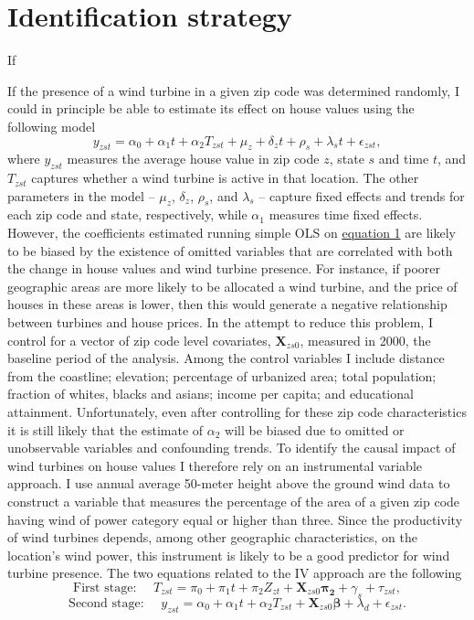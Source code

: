 \documentclass[twoside,12pt]{article}
\begin{document}
\section{Identification strategy}
If 

If the presence of a wind turbine in a given zip code was determined randomly, I could in principle be able to estimate its effect on house values using the following model
\begin{equation}\label{estimation}
y_{zst}=\alpha_0 + \alpha_1 t + \alpha_2 T_{zst} + \mu_z + \delta_z t + \rho_s + \lambda_s t + \epsilon_{zst},
\end{equation}
where $y_{zst}$ measures the average house value in zip code $z$, state $s$ and time $t$, and $T_{zst}$ captures whether a wind turbine is active in that location. The other parameters in the model -- $\mu_z$, $\delta_z$, $\rho_s$, and $\lambda_s$ -- capture fixed effects and trends for each zip code and state, respectively, while $\alpha_1$ measures time fixed effects. However, the coefficients estimated running simple OLS on \hyperref[estimation]{equation 1} are likely to be biased by the existence of omitted variables that are correlated with both the change in house values and wind turbine presence. For instance, if poorer geographic areas are more likely to be allocated a wind turbine, and the price of houses in these areas is lower, then this would generate a negative relationship between turbines and house prices. In the attempt to reduce this problem, I control for a vector of zip code level covariates,  $\mathbf{X}_{zs0}$, measured in 2000, the baseline period of the analysis. Among the control variables I include distance from the coastline; elevation; percentage of urbanized area; total population; fraction of whites, blacks and asians; income per capita; and educational attainment. Unfortunately, even after controlling for these zip code characteristics it is still likely that the estimate of $\alpha_2$ will be biased due to omitted or unobservable variables and confounding trends. To identify the causal impact of wind turbines on house values I therefore rely on an instrumental variable approach. I use annual average 50-meter height above the ground wind data to construct a variable that measures the percentage of the area of a given zip code having wind of power category equal or higher than three. Since the productivity of wind turbines depends, among other geographic characteristics, on the location's wind power, this instrument is likely to be a good predictor for wind turbine presence. The two equations related to the IV approach are the following
\begin{equation}\label{firststage}
\text{First stage: }\quad T_{zst}=\pi_0 + \pi_1 t + \pi_2 Z_{zt} + \mathbf{X}_{zs0} \boldsymbol{\pi}_{\mathbf{2}} + \gamma_s + \tau_{zst},
\end{equation}
\begin{equation}\label{secondstage}
\text{Second stage: }\quad y_{zst}=\alpha_0 + \alpha_1 t + \alpha_2 T_{zst} + \mathbf{X}_{zs0} \boldsymbol{\beta} +  \lambda_d + \epsilon_{zst}.
\end{equation}
\end{document}
